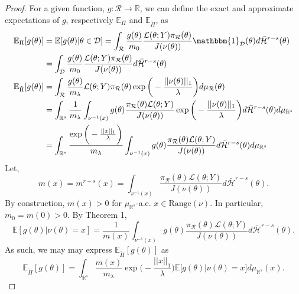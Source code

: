 \documentclass[10pt,fleqn]{article} \pdfoutput=1
\newcommand{\bb}[1]{\mathbb{#1}} \newcommand{\mc}[1]{\mathcal{#1}}
\DeclareMathOperator{\1}{\mathbbm{1}} \DeclareMathOperator{\bigO}{\mc O}
\begin{document}
\begin{proof}
For a given function, $g:\mathcal{R}\to\mathbb{R}$, we can define the exact and approximate expectations of $g$, respectively $\bb E_\Pi$ and $\bb E_{\tilde{\Pi}}$, as
\begin{align*}
\bb E_\Pi[g(\theta)] &= \bb E[g(\theta)|\theta\in\mathcal{D}] = \int_\mathcal{R} \frac{g(\theta)}{m_0} \frac{\mathcal{L}(\theta;Y)\pi_\mathcal{R}(\theta)}{J(\nu(\theta))}\mathbbm{1}_\mathcal{D}(\theta)d\bar{\mathcal{H}}^{r-s}(\theta) \\
&=\int_\mathcal{D} \frac{g(\theta)}{m_0} \frac{\mathcal{L}(\theta;Y)\pi_\mathcal{R}(\theta)}{J(\nu(\theta))}d\bar{\mathcal{H}}^{r-s}(\theta)\\
\bb E_{\tilde{\Pi}}[g(\theta)] &= \int_\mathcal{R}  \frac{g(\theta)}{m_\lambda} \mathcal{L}(\theta;Y)\pi_\mathcal{R}(\theta)\exp\bigg(-\frac{||\nu(\theta)||_1}{\lambda}\bigg)d\mu_\mathcal{R}(\theta) \\
&= \int_{\mathbb{R}^s} \frac{1}{m_\lambda} \int_{\nu^{-1}(x)} g(\theta) \frac{\pi_\mathcal{R}(\theta)\mathcal{L}(\theta;Y)}{J(\nu(\theta))} \exp\bigg(-\frac{||\nu(\theta)||_1}{\lambda}\bigg) d\bar{\mathcal{H}}^{r-s}(\theta) d\mu_{\mathbb{R}^s} \\
&=\int_{\mathbb{R}^s} \frac{\exp\bigg(-\frac{||x||_1}{\lambda}\bigg) }{m_\lambda} \int_{\nu^{-1}(x)} g(\theta) \frac{\pi_\mathcal{R}(\theta)\mathcal{L}(\theta;Y)}{J(\nu(\theta))} d\bar{\mathcal{H}}^{r-s}(\theta) d\mu_{\mathbb{R}^s} 
\end{align*}
Let, $$m(x) = m^{r-s}(x) = \int_{\nu^{-1}(x)}\frac{\pi_\mathcal{R}(\theta)\mathcal{L}(\theta;Y)}{J(\nu(\theta))} d\bar{\mathcal{H}}^{r-s}(\theta) .$$
By construction, $m(x) > 0$ for $\mu_{\mathbb{R}^s}$-a.e. $x\in \text{Range}(\nu)$. In particular, $m_0=m(0)>0$. By Theorem 1,
\begin{equation}
\bb E[g(\theta) | \nu(\theta) = x] = \frac{1}{m(x)} \int_{\nu^{-1}(x)} g(\theta)\frac{\pi_\mathcal{R}(\theta)\mathcal{L}(\theta;Y)}{J(\nu(\theta))} d\bar{\mathcal{H}}^{r-s}(\theta).
\end{equation}
As such, we may may express $\bb E_{\tilde{\Pi}}[g(\theta)]$ as 
\begin{equation}
\bb E_{\tilde{\Pi}}[g(\theta)] = \int_{\mathbb{R}^s} \frac{m(x)}{m_\lambda}\exp\bigg(-\frac{||x||_1}{\lambda}\bigg) \bb E\big[g(\theta)|\nu(\theta)=x\big] d\mu_{\mathbb{R}^s}(x).
\end{equation}


\end{proof}
\end{document}

